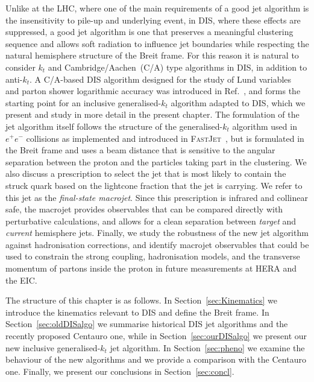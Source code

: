 Unlike at the LHC, where one of the main requirements of a good jet
algorithm is the insensitivity to pile-up and underlying event, in
DIS, where these effects are suppressed, a good jet algorithm is one
that preserves a meaningful clustering sequence and allows soft
radiation to influence jet boundaries while respecting the natural
hemisphere structure of the Breit frame. For this reason it is natural
to consider $k_t$ and Cambridge/Aachen~(C/A) type algorithms in DIS,
in addition to anti-$k_t$. A C/A-based DIS algorithm designed for the
study of Lund variables~\cite{Dreyer:2018nbf,vanBeekveld:2025zjh} and
parton shower logarithmic accuracy was introduced in
Ref.~\cite{vanBeekveld:2023chs}, and forms the starting point for an
inclusive generalised-$k_t$ algorithm adapted to DIS,
which we present and study in more detail in the present chapter. The
formulation of the jet algorithm itself follows the structure of the
generalised-$k_t$ algorithm used in $e^+e^-$ collisions as implemented
and introduced in \textsc{FastJet}~\cite{Cacciari:2011ma}, but is formulated
in the Breit frame and uses a beam distance that is sensitive to the
angular separation between the proton and the particles taking part in
the clustering. We also discuss a prescription to select the jet that
is most likely to contain the struck quark based on the lightcone
fraction that the jet is carrying. We refer to this jet as the
\emph{final-state macrojet}. Since this prescription is infrared and
collinear safe, the macrojet provides observables that can be compared
directly with perturbative calculations, and allows for a clean separation
between \emph{target} and \emph{current} hemisphere jets. Finally, we
study the robustness of the new jet algorithm against hadronisation
corrections, and identify macrojet observables that could be used to
constrain the strong coupling, hadronisation models, and the transverse
momentum of partons inside the proton in future measurements at HERA
and the EIC.

The structure of this chapter is as follows.
%
In Section~\ref{sec:Kinematics} we introduce the kinematics relevant
to DIS and define the Breit frame.
%
In Section~\ref{sec:oldDISalgo} we summarise historical DIS jet
algorithms and the recently proposed Centauro one, while in
Section~\ref{sec:ourDISalgo} we present our new inclusive
generalised-$k_t$ jet algorithm.
%
In Section~\ref{sec:pheno} we examine the behaviour of the new
algorithms and we provide a comparison with the Centauro one.
%
Finally, we present our conclusions in Section~\ref{sec:concl}.

